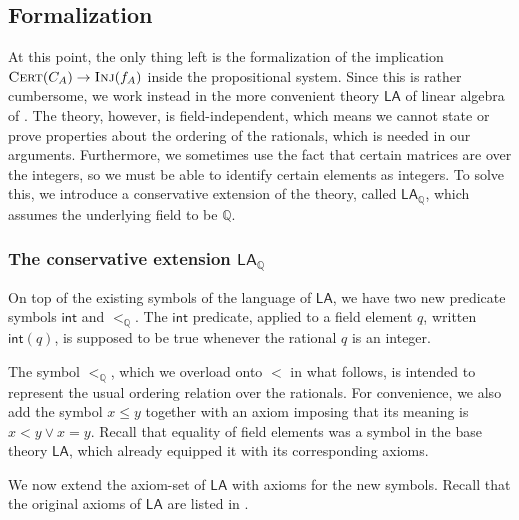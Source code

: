 \documentclass[11pt]{article}
\newcommand{\LA}{\mathsf{LA}}
\newcommand{\LAQ}{\mathsf{LA}_\mathbb{Q}}
\newcommand{\LAint}{\mathsf{int}}
\theoremstyle{definition}
\theoremstyle{plain}
\theoremstyle{remark}
\newcommand{\bQ}{\mathbb{Q}}
\begin{document}
\subsection{Formalization}
\label{subsec:formalization}
At this point, the only thing left is the formalization of the implication  $\operatorname{\textsc{Cert}}(C_A) \to \operatorname{\textsc{Inj}}(f_A)$ inside the propositional system. Since this is rather cumbersome, we work instead in the more convenient theory $\LA$ of linear algebra of \citeauthor{cooksoltys} \cite{cooksoltys}. The theory, however, is field-independent, which means we cannot state or prove properties about the ordering of the rationals, which is needed in our arguments. Furthermore, we sometimes use the fact that certain matrices are over the integers, so we must be able to identify certain elements as integers. To solve this, we introduce a conservative extension of the theory, called $\LAQ$, which assumes the underlying field to be $\bQ$.

\subsubsection{The conservative extension $\LAQ$}
\label{subsubsec:LAQ}
On top of the existing symbols of the language of $\LA$, we have two new predicate symbols $\mathsf{int}$ and $<_\bQ$. The $\LAint$ predicate, applied to a field element $q$, written $\LAint(q)$, is supposed to be true whenever the rational $q$ is an integer.

The symbol $<_\bQ$, which we overload onto $<$ in what follows, is intended to represent the usual ordering relation over the rationals. For convenience, we also add the symbol $x \leq y$ together with an axiom imposing that its meaning is $x < y \lor x = y$. Recall that equality of field elements was a symbol in the base theory $\LA$, which already equipped it with its corresponding axioms.

We now extend the axiom-set of $\LA$ with axioms for the new symbols. Recall that the original axioms of $\LA$ are listed in .
\end{document}
